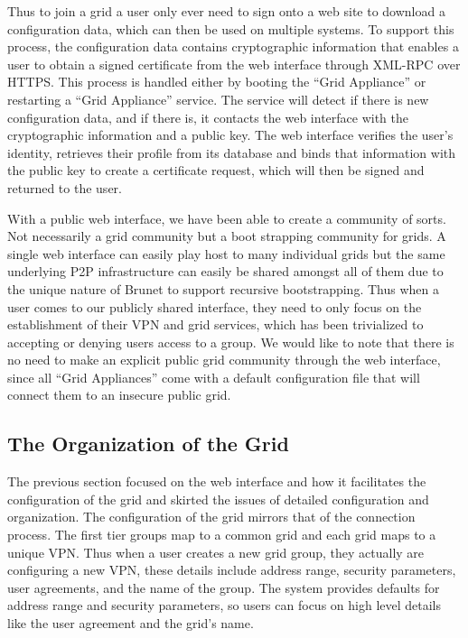 \documentclass[conference]{IEEEtran}
\begin{document}
Thus to join a grid a user only ever need to sign onto a web site to download a
configuration data, which can then be used on multiple systems.  To support
this process, the configuration data contains cryptographic information that
enables a user to obtain a signed certificate from the web interface through
XML-RPC over HTTPS.  This process is handled either by booting the ``Grid
Appliance'' or restarting a ``Grid Appliance'' service.  The service will
detect if there is new configuration data, and if there is, it contacts the web
interface with the cryptographic information and a public key.  The web
interface verifies the user's identity, retrieves their profile from its
database and binds that information with the public key to create a certificate
request, which will then be signed and returned to the user.

With a public web interface, we have been able to create a community of sorts.
Not necessarily a grid community but a boot strapping community for grids.  A
single web interface can easily play host to many individual grids but the same
underlying P2P infrastructure can easily be shared amongst all of them due to
the unique nature of Brunet to support recursive bootstrapping.  Thus when a
user comes to our publicly shared interface, they need to only focus on the
establishment of their VPN and grid services, which has been trivialized to
accepting or denying users access to a group.  We would like to note that there
is no need to make an explicit public grid community through the web interface,
since all ``Grid Appliances'' come with a default configuration file that will
connect them to an insecure public grid.  

\subsection{The Organization of the Grid}

The previous section focused on the web interface and how it facilitates the
configuration of the grid and skirted the issues of detailed configuration and
organization.  The configuration of the grid mirrors that of the connection
process.  The first tier groups map to a common grid and each grid maps to a
unique VPN.  Thus when a user creates a new grid group, they actually are
configuring a new VPN, these details include address range, security
parameters, user agreements, and the name of the group.  The system provides
defaults for address range and security parameters, so users can focus on high
level details like the user agreement and the grid's name.
\end{document}
